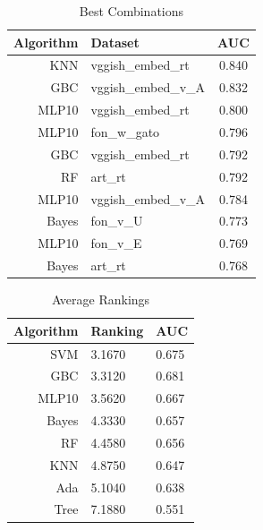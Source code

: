 \documentclass[a4paper,10pt]{article}
\begin{document}
\begin{table}[!htp]
\centering
\caption{Best Combinations}
\begin{tabular}{rl|c}
Algorithm&Dataset&AUC\\
\hline
KNN&vggish\_embed\_rt&0.840 \\
GBC&vggish\_embed\_v\_A&0.832 \\
MLP10&vggish\_embed\_rt&0.800 \\
MLP10&fon\_w\_gato&0.796 \\
GBC&vggish\_embed\_rt&0.792 \\
RF&art\_rt&0.792 \\
MLP10&vggish\_embed\_v\_A&0.784 \\
Bayes&fon\_v\_U&0.773 \\
MLP10&fon\_v\_E&0.769 \\
Bayes&art\_rt&0.768 \\
\end{tabular}
\end{table}
\begin{table}[!htp]
\centering
\caption{Average Rankings}
\begin{tabular}{r|l|l}
Algorithm&Ranking&AUC\\
\hline
 SVM & 3.1670 & 0.675 \\
 GBC & 3.3120 & 0.681 \\
 MLP10 & 3.5620 & 0.667 \\
 Bayes & 4.3330 & 0.657 \\
 RF & 4.4580 & 0.656 \\
 KNN & 4.8750 & 0.647 \\
 Ada & 5.1040 & 0.638 \\
 Tree & 7.1880 & 0.551 \\
\end{tabular}
\end{table}
\end{document}
